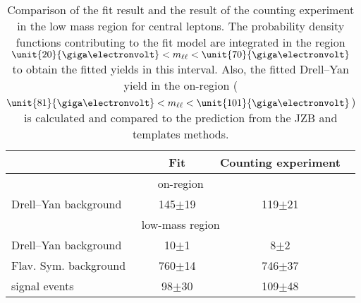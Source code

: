 
\begin{table}[btp]
 \renewcommand{\arraystretch}{1.3}
 \setlength{\belowcaptionskip}{6pt}
 \centering
 \caption{Comparison of the fit result and the result of the counting experiment in the low mass region for central leptons. The probability density functions contributing to the fit model are integrated in the region $\unit{20}{\giga\electronvolt} < \mll < \unit{70}{\giga\electronvolt}$ to obtain the fitted yields in this interval. Also, the fitted Drell--Yan yield in the on-\Z region ($\unit{81}{\giga\electronvolt} < \mll < \unit{101}{\giga\electronvolt}$) is calculated and compared to the prediction from the JZB and \MET templates methods. 
     }
  \label{tab:fitResultLowMass}
  \begin{tabular}{l| cc }
    \hline
    \hline
                                &  Fit        & Counting experiment \\ 

    \hline
    \multicolumn{3}{c}{on-\Z region} \\ 

    \hline
        Drell--Yan background       &  145$\pm$19                   & 119$\pm$21  \\

\hline
    \multicolumn{3}{c}{low-mass region} \\ 

    \hline
        Drell--Yan background       &  10$\pm$1                   & 8$\pm$2  \\
        Flav. Sym. background       &  760$\pm$14                   & 746$\pm$37  \\
        signal events       &  98$\pm$30                   & 109$\pm$48  \\

    \hline
    \hline    
  \end{tabular}
\end{table}


